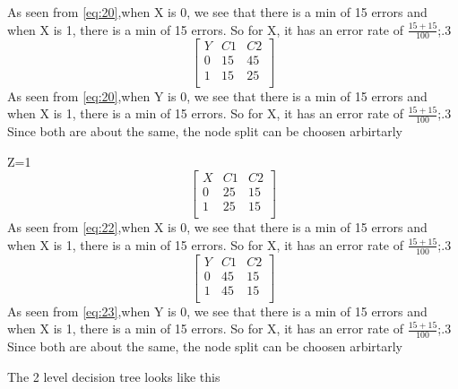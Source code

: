 \documentclass[12pt,english]{article}
\begin{document}
As seen from \eqref{eq:20},when X is 0, we see that there is a min of 15 errors and when X is 1, there is a min of 15 errors. So for X, it has an error rate of $\frac{15+15}{100}$;.3\\
\begin{equation*}\tag{2}\label{eq:21}
\begin{bmatrix} Y & C1 & C2 \\0 & 15 &  45 \\1 & 15 &  25 \\ \end{bmatrix}
\end{equation*}
As seen from \eqref{eq:20},when Y is 0, we see that there is a min of 15 errors and when X is 1, there is a min of 15 errors. So for X, it has an error rate of $\frac{15+15}{100}$;.3\\
Since both are about the same, the node split can be choosen arbirtarly\par
Z=1\\
\begin{equation*}\tag{1}\label{eq:22}
\begin{bmatrix} X & C1 & C2 \\0 & 25 &  15 \\1 & 25 &  15 \\ \end{bmatrix}
\end{equation*}
As seen from \eqref{eq:22},when X is 0, we see that there is a min of 15 errors and when X is 1, there is a min of 15 errors. So for X, it has an error rate of $\frac{15+15}{100}$;.3\\
\begin{equation*}\tag{2}\label{eq:23}
\begin{bmatrix} Y & C1 & C2 \\0 & 45 &  15 \\1 & 45 &  15 \\ \end{bmatrix}
\end{equation*}
As seen from \eqref{eq:23},when Y is 0, we see that there is a min of 15 errors and when X is 1, there is a min of 15 errors. So for X, it has an error rate of $\frac{15+15}{100}$;.3\\
Since both are about the same, the node split can be choosen arbirtarly\par
The 2 level decision tree looks like this\\
\end{document}
